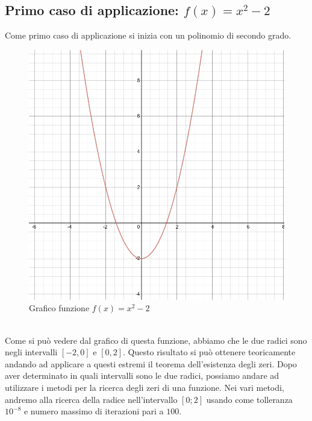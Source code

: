\documentclass[12pt, letterpaper]{article}
\begin{document}
\subsection{Primo caso di applicazione: $f(x)=x^2-2$}
Come primo caso di applicazione si inizia con un polinomio di secondo grado.
\begin{figure}[ht!]
    \centering
    \includegraphics[scale=0.5]{Parabola.png}
    \caption{Grafico funzione $f(x)=x^2-2$}
\end{figure} \\
Come si può vedere dal grafico di questa funzione, abbiamo che le due radici sono negli intervalli $[-2,0]$ e $[0,2]$.
Questo risultato si può ottenere teoricamente andando ad applicare a questi estremi il teorema dell'esistenza degli zeri.
Dopo aver determinato in quali intervalli sono le due radici, possiamo andare ad utilizzare i metodi per la ricerca degli zeri di una funzione.
Nei vari metodi, andremo alla ricerca della radice nell'intervallo $[0;2]$ usando come tolleranza $10^{-8}$ e numero massimo di iterazioni pari a $100$.
\newpage
\end{document}
